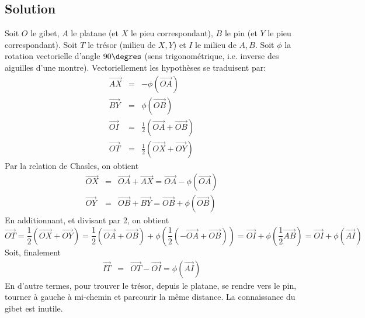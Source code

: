 \documentclass{article}
\newenvironment{solution}{\subsection{Solution}}{\pagebreak}
\begin{document}
\begin{solution}
\begin{center}
\end{center}
Soit $O$ le gibet, $A$ le platane (et $X$ le pieu correspondant), $B$ le pin (et $Y$ le pieu correspondant). Soit $T$ le trésor (milieu de $X,Y$) et $I$ le milieu de $A,B$. Soit $\phi$ la rotation vectorielle d'angle $90\degres$ (sens trigonométrique, i.e. inverse des aiguilles d'une montre). Vectoriellement les hypothèses se traduisent par:
\begin{eqnarray*}
\overrightarrow{AX} & = & -\phi(\overrightarrow{OA}) \\
\overrightarrow{BY} & = & \phi(\overrightarrow{OB}) \\
\overrightarrow{OI} & = & \frac{1}{2} (\overrightarrow{OA}+\overrightarrow{OB}) \\
\overrightarrow{OT} & = & \frac{1}{2} (\overrightarrow{OX}+\overrightarrow{OY})
\end{eqnarray*}
Par la relation de Chasles, on obtient
\begin{eqnarray*}
\overrightarrow{OX} & = & \overrightarrow{OA}+\overrightarrow{AX} = \overrightarrow{OA} - \phi(\overrightarrow{OA}) \\
\overrightarrow{OY} & = & \overrightarrow{OB}+\overrightarrow{BY} = \overrightarrow{OB} + \phi(\overrightarrow{OB})
\end{eqnarray*}
En additionnant, et divisant par 2, on obtient
\[
\overrightarrow{OT} = \frac{1}{2} (\overrightarrow{OX}+\overrightarrow{OY}) =
\frac{1}{2} (\overrightarrow{OA}+\overrightarrow{OB}) +\phi(\frac{1}{2}(-\overrightarrow{OA}+\overrightarrow{OB})) =
\overrightarrow{OI}+\phi(\frac{1}{2}\overrightarrow{AB}) =
\overrightarrow{OI}+\phi(\overrightarrow{AI})
\]
Soit, finalement
\begin{eqnarray*}
\overrightarrow{IT} & = & \overrightarrow{OT}-\overrightarrow{OI} =\phi(\overrightarrow{AI})
\end{eqnarray*}
En d'autre termes, pour trouver le trésor, depuis le platane, se rendre vers le pin, tourner à gauche à mi-chemin et parcourir la même distance. La connaissance du gibet est inutile.
\end{solution}
\end{document}
